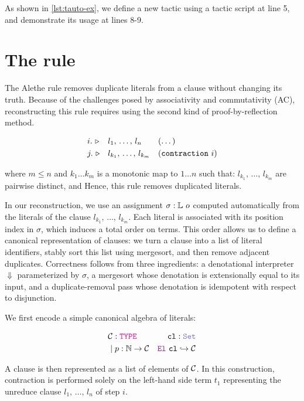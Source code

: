 As shown in \cref{lst:tauto-ex}, we define a new tactic  using a tactic script at line 5, and demonstrate its usage at lines 8-9.


\section{The \texttt{} rule}
\label{ssec:contraction-recon}

The Alethe rule  removes duplicate literals from a clause without changing its truth.
Because of the challenges posed by associativity and commutativity (AC), reconstructing this rule requires using the second kind of proof-by-reflection method.

\begin{align*}
&i.~\triangleright &  &l_1,\, \dots,\, l_{n}       & & (\dots)  \\
&j.~\triangleright &  &l_{k_1},\, \dots,\, l_{k_m} & & (\kw{contraction}~i) 
\end{align*}

where $m \leq n$ and $k_1 \dots k_m$ is a monotonic map to $1 \dots n$ such that: $l_{k_1},\, \dots,\, l_{k_m}$ are pairwise distinct, and Hence, this rule removes duplicated literals.

In our reconstruction, we use an assignment $\sigma: \bb{L}~o$ computed automatically from the literals of the clause $l_{k_1},\, \dots,\, l_{k_m}$.
Each literal is associated with its position index in $\sigma$, which induces a total order on terms. 
This order allows us to define a canonical representation of clauses: we turn a clause into a list of literal identifiers, stably sort this list using mergesort, and then remove adjacent duplicates.  
Correctness follows from three ingredients: a denotational interpreter $\Downarrow$ parameterized by $\sigma$, a mergesort whose denotation is extensionally equal to its input, and a duplicate-removal pass whose denotation is idempotent with respect to disjunction.

We first encode a simple canonical algebra of literals:

\begin{align*}
&\cal{C} : \type & \kw{cl}: \set  \\
&\pipe p : \N \ra \cal{C} &\el~\kw{cl} \re \cal{C}
\end{align*}

A clause is then represented as a list of elements of $\cal{C}$.
In this construction, contraction is performed solely on the left-hand side term $t_1$ representing the unreduce clause $l_1,\, \dots,\, l_{n}$ of step $i$.

